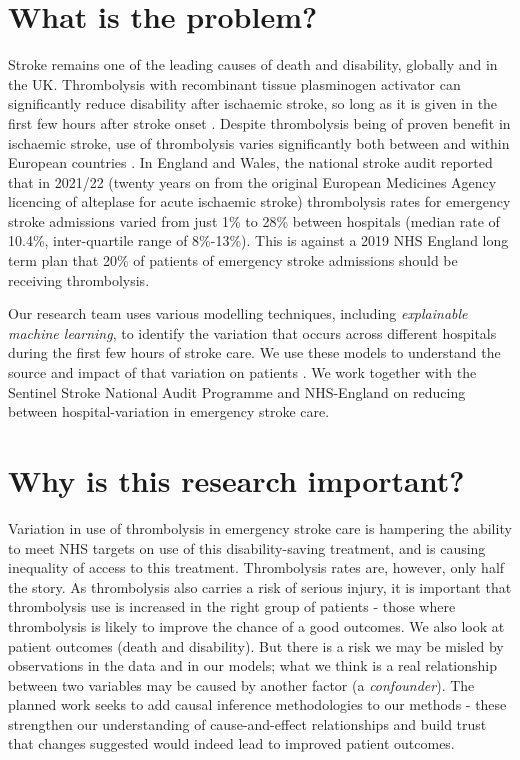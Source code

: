 \section{What is the problem?}

Stroke remains one of the leading causes of death and disability, globally and in the UK. Thrombolysis with recombinant tissue plasminogen activator can significantly reduce disability after ischaemic stroke, so long as it is given in the first few hours after stroke onset \cite{emberson_effect_2014}. Despite thrombolysis being of proven benefit in ischaemic stroke, use of thrombolysis varies significantly both between and within European countries \cite{aguiar_de_sousa_access_2019}. In England and Wales, the national stroke audit reported that in 2021/22 (twenty years on from the original European Medicines Agency licencing of alteplase for acute ischaemic stroke) thrombolysis rates for emergency stroke admissions varied from just 1\% to 28\% between hospitals (median rate of 10.4\%, inter-quartile range of 8\%-13\%). This is against a 2019 NHS England long term plan that 20\% of patients of emergency stroke admissions should be receiving thrombolysis.

Our research team uses various modelling techniques, including \textit{explainable machine learning}, to identify the variation that occurs across different hospitals during the first few hours of stroke care. We use these models to understand the source and impact of that variation on patients \cite{allen_using_2022, allen_use_2022}. We work together with the Sentinel Stroke National Audit Programme and NHS-England on reducing between hospital-variation in emergency stroke care. 

\section{Why is this research important?}

Variation in use of thrombolysis in emergency stroke care is hampering the ability to meet NHS targets on use of this disability-saving treatment, and is causing inequality of access to this treatment. Thrombolysis rates are, however, only half the story. As thrombolysis also carries a risk of serious injury, it is important that thrombolysis use is increased in the right group of patients - those where thrombolysis is likely to improve the chance of a good outcomes. We also look at patient outcomes (death and disability). But there is a risk we may be misled by observations in the data and in our models; what we think is a real relationship between two variables may be caused by another factor (a \textit{confounder}). The planned work seeks to add causal inference methodologies to our methods - these strengthen our understanding of cause-and-effect relationships and build trust that changes suggested would indeed lead to improved patient outcomes.


